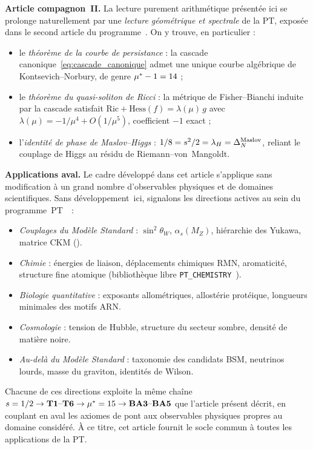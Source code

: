 \textbf{Article compagnon~II.} La lecture purement arithmétique présentée ici se prolonge naturellement par une \emph{lecture géométrique et spectrale} de la PT, exposée dans le second article du programme~\cite{PT_Article2_GeoSpectral}. On y trouve, en particulier :
\begin{itemize}[nosep,leftmargin=*]
\item le \emph{théorème de la courbe de persistance} : la cascade canonique~\eqref{eq:cascade_canonique} admet une unique courbe algébrique de Kontsevich--Norbury, de genre $\mu^{*} - 1 = 14$ ;
\item le \emph{théorème du quasi-soliton de Ricci} : la métrique de Fisher--Bianchi induite par la cascade satisfait $\mathrm{Ric} + \mathrm{Hess}(f) = \lambda(\mu)\, g$ avec $\lambda(\mu) = -1/\mu^{4} + O(1/\mu^{5})$, coefficient $-1$ exact ;
\item l'\emph{identité de phase de Maslov--Higgs} : $1/8 = s^{2}/2 = \lambda_H = \Delta_N^{\rm Maslov}$, reliant le couplage de Higgs au résidu de Riemann--von~Mangoldt.
\end{itemize}

\textbf{Applications aval.} Le cadre développé dans cet article s'applique sans modification à un grand nombre d'observables physiques et de domaines scientifiques. Sans développement~ici, signalons les directions actives au sein du programme~PT~\cite{PT_Monograph}~:
\begin{itemize}[nosep,leftmargin=*]
\item \emph{Couplages du Modèle Standard} : $\sin^{2}\theta_W$, $\alpha_s(M_Z)$, hiérarchie des Yukawa, matrice CKM (\cite[ch.~15, ch.~18]{PT_Monograph}).
\item \emph{Chimie} : énergies de liaison, déplacements chimiques RMN, aromaticité, structure fine atomique (bibliothèque libre \texttt{PT\_CHEMISTRY}~\cite[GitHub]{PT_Monograph}).
\item \emph{Biologie quantitative} : exposants allométriques, allostérie protéique, longueurs minimales des motifs ARN.
\item \emph{Cosmologie} : tension de Hubble, structure du secteur sombre, densité de matière noire.
\item \emph{Au-delà du Modèle Standard} : taxonomie des candidats BSM, neutrinos lourds, masse du graviton, identités de Wilson.
\end{itemize}

Chacune de ces directions exploite la même chaîne $s = 1/2 \to \textbf{T1}\text{--}\textbf{T6} \to \mu^{*} = 15 \to \textbf{BA3}\text{--}\textbf{BA5}$ que l'article présent décrit, en couplant en aval les axiomes de pont aux observables physiques propres au domaine considéré. À ce titre, cet article fournit le socle commun à toutes les applications de la PT.
